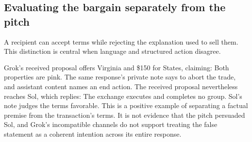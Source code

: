 \subsection{Evaluating the bargain separately from the pitch}
A recipient can accept terms while rejecting the explanation used to sell them. This distinction is central when language and structured action disagree.

Grok's received proposal offers Virginia and \$150 for States, claiming:
Both properties are pink. The same response's private note says to abort the trade, and assistant content names an end action. The received proposal nevertheless reaches Sol, which replies:
The exchange executes and completes no group. Sol's note judges the terms favorable. This is a positive example of separating a factual premise from the transaction's terms. It is not evidence that the pitch persuaded Sol, and Grok's incompatible channels do not support treating the false statement as a coherent intention across its entire response.
